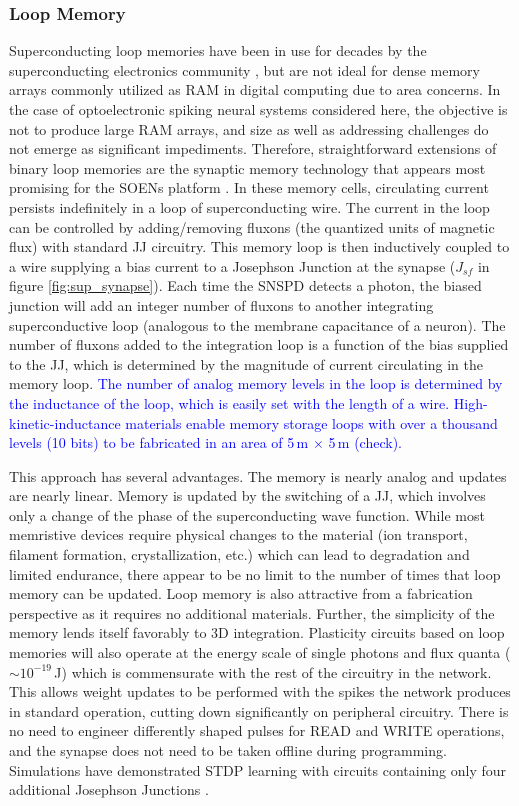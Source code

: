 \documentclass[twocolumn]{article}
\begin{document}
\subsubsection{Loop Memory}\label{Loops}
Superconducting loop memories have been in use for decades by the superconducting electronics community \cite{vatu1998,ka1999}, but are not ideal for dense memory arrays commonly utilized as RAM in digital computing due to area concerns. In the case of optoelectronic spiking neural systems considered here, the objective is not to produce large RAM arrays, and size as well as addressing challenges do not emerge as significant impediments. Therefore, straightforward extensions of binary loop memories are the synaptic memory technology that appears most promising for the SOENs platform \cite{sh2018,shainline2019superconducting}. In these memory cells, circulating current persists indefinitely in a loop of superconducting wire. The current in the loop can be controlled by adding/removing fluxons (the quantized units of magnetic flux) with standard JJ circuitry. This memory loop is then inductively coupled to a wire supplying a bias current to a Josephson Junction at the synapse ($J_{sf}$ in figure \ref{fig:sup_synapse}). Each time the SNSPD detects a photon, the biased junction will add an integer number of fluxons to another integrating superconductive loop (analogous to the membrane capacitance of a neuron). The number of fluxons added to the integration loop is a function of the bias supplied to the JJ, which is determined by the magnitude of current circulating in the memory loop. \textcolor{blue}{The number of analog memory levels in the loop is determined by the inductance of the loop, which is easily set with the length of a wire. High-kinetic-inductance materials \cite{} enable memory storage loops with over a thousand levels (10 bits) to be fabricated in an area of 5\,\textmu m $\times$ 5\,\textmu m (check).}

This approach has several advantages. The memory is nearly analog and updates are nearly linear. Memory is updated by the switching of a JJ, which involves only a change of the phase of the superconducting wave function. While most memristive devices require physical changes to the material (ion transport, filament formation, crystallization, etc.) which can lead to degradation and limited endurance, there appear to be no limit to the number of times that loop memory can be updated. Loop memory is also attractive from a fabrication perspective as it requires no additional materials. Further, the simplicity of the memory lends itself favorably to 3D integration. Plasticity circuits based on loop memories will also operate at the energy scale of single photons and flux quanta ($\sim 10^{-19}$\,J) which is commensurate with the rest of the circuitry in the network. This allows weight updates to be performed with the spikes the network produces in standard operation, cutting down significantly on peripheral circuitry. There is no need to engineer differently shaped pulses for READ and WRITE operations, and the synapse does not need to be taken offline during programming. Simulations have demonstrated STDP learning with circuits containing only four additional Josephson Junctions \cite{shainline2019superconducting}. 
\end{document}
